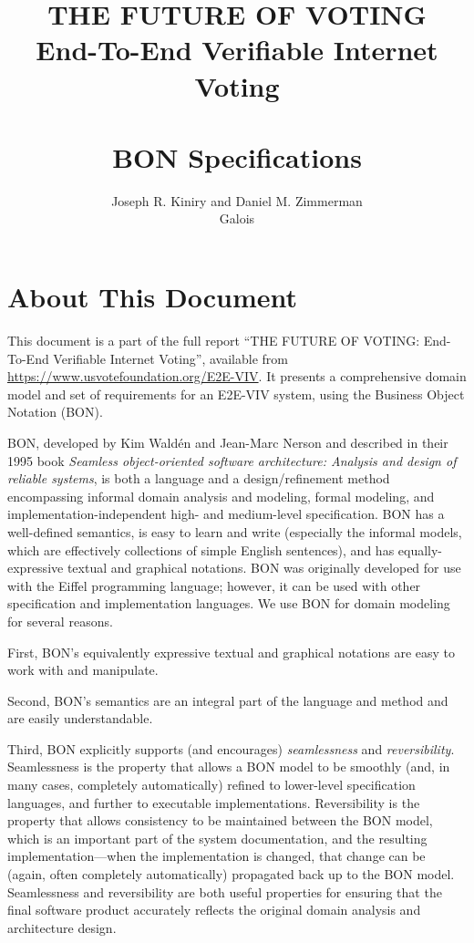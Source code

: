 \documentclass[]{report}
\title{THE FUTURE OF VOTING \\ End-To-End Verifiable Internet Voting \\ \ \\ BON Specifications}
\author{Joseph R. Kiniry and Daniel M. Zimmerman \\ Galois}
\begin{document}
\hypersetup{pageanchor=false}
\maketitle
\hypersetup{pageanchor=true}

\tableofcontents

\chapter*{About This Document}

This document is a part of the full report ``THE FUTURE OF VOTING:
End-To-End Verifiable Internet Voting'', available from
\url{https://www.usvotefoundation.org/E2E-VIV}. It presents a
comprehensive domain model and set of requirements for an E2E-VIV
system, using the Business Object Notation (BON). 

BON, developed by Kim Wald\'{e}n and Jean-Marc Nerson and described in
their 1995 book \emph{Seamless object-oriented software architecture:
  Analysis and design of reliable systems}, is both a language and a
design/refinement method encompassing informal domain analysis and
modeling, formal modeling, and implementation-independent high- and
medium-level specification. BON has a well-defined semantics, is easy
to learn and write (especially the informal models, which are
effectively collections of simple English sentences), and has
equally-expressive textual and graphical notations. BON was originally
developed for use with the Eiffel programming language; however, it
can be used with other specification and implementation languages. We
use BON for domain modeling for several reasons.

First, BON's equivalently expressive textual and graphical notations
are easy to work with and manipulate.

Second, BON's semantics are an integral part of the language and
method and are easily understandable. 

Third, BON explicitly supports (and encourages) \emph{seamlessness}
and \emph{reversibility}. Seamlessness is the property that allows a
BON model to be smoothly (and, in many cases, completely
automatically) refined to lower-level specification languages, and
further to executable implementations. Reversibility is the property
that allows consistency to be maintained between the BON model, which
is an important part of the system documentation, and the resulting
implementation---when the implementation is changed, that change can
be (again, often completely automatically) propagated back up to the
BON model. Seamlessness and reversibility are both useful properties
for ensuring that the final software product accurately reflects the
original domain analysis and architecture design.
\end{document}
